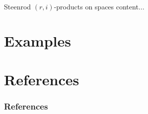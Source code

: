 \documentclass[10pt,t]{beamer}
\begin{document}
\begin{frame}{Steenrod $(r,i)$-products on spaces}
	content...
\end{frame}


\section{Examples}


\section*{References}

\begin{frame}[allowframebreaks]
	\frametitle{References}
	\nocite{whitney1935history}
	
	
\end{frame}
\end{document}
